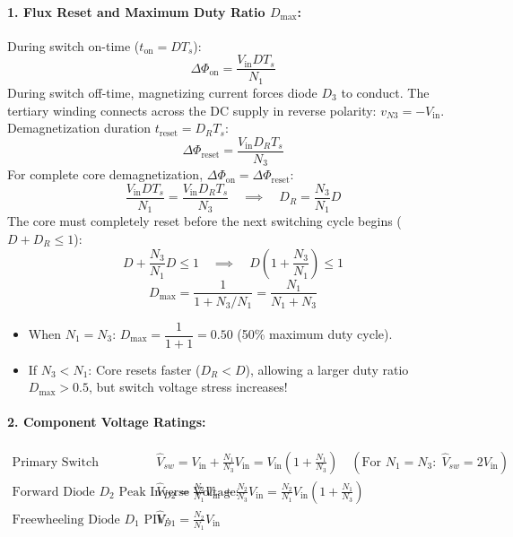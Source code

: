 \paragraph{1. Flux Reset and Maximum Duty Ratio $D_{\max}$:}
During switch on-time ($t_{\mathrm{on}} = D T_s$):
\[
\Delta \Phi_{\mathrm{on}} = \frac{V_{\mathrm{in}} D T_s}{N_1}
\]
During switch off-time, magnetizing current forces diode $D_3$ to conduct. The tertiary winding connects across the DC supply in reverse polarity: $v_{N3} = -V_{\mathrm{in}}$.
Demagnetization duration $t_{\mathrm{reset}} = D_R T_s$:
\[
\Delta \Phi_{\mathrm{reset}} = \frac{V_{\mathrm{in}} D_R T_s}{N_3}
\]
For complete core demagnetization, $\Delta \Phi_{\mathrm{on}} = \Delta \Phi_{\mathrm{reset}}$:
\begin{equation}
\frac{V_{\mathrm{in}} D T_s}{N_1} = \frac{V_{\mathrm{in}} D_R T_s}{N_3} \quad\implies\quad D_R = \frac{N_3}{N_1} D
\end{equation}
The core must completely reset before the next switching cycle begins ($D + D_R \le 1$):
\[
D + \frac{N_3}{N_1} D \le 1 \quad\implies\quad D\left(1 + \frac{N_3}{N_1}\right) \le 1
\]
\begin{equation}
D_{\max} = \frac{1}{1 + N_3/N_1} = \frac{N_1}{N_1 + N_3}
\end{equation}
\begin{itemize}
  \item When $N_1 = N_3$: $D_{\max} = \dfrac{1}{1 + 1} = 0.50$ (50\% maximum duty cycle).
  \item If $N_3 < N_1$: Core resets faster ($D_R < D$), allowing a larger duty ratio $D_{\max} > 0.5$, but switch voltage stress increases!
\end{itemize}

\paragraph{2. Component Voltage Ratings:}
\begin{align}
\text{Primary Switch Blocking Voltage:} \quad & \hat{V}_{sw} = V_{\mathrm{in}} + \frac{N_1}{N_3} V_{\mathrm{in}} = V_{\mathrm{in}}\left(1 + \frac{N_1}{N_3}\right) \quad (\text{For } N_1 = N_3:\; \hat{V}_{sw} = 2 V_{\mathrm{in}}) \\
\text{Forward Diode $D_2$ Peak Inverse Voltage:} \quad & \hat{V}_{D2} = \frac{N_2}{N_1} V_{\mathrm{in}} + \frac{N_2}{N_3} V_{\mathrm{in}} = \frac{N_2}{N_1} V_{\mathrm{in}}\left(1 + \frac{N_1}{N_3}\right) \\
\text{Freewheeling Diode $D_1$ PIV:} \quad & \hat{V}_{D1} = \frac{N_2}{N_1} V_{\mathrm{in}}
\end{align}

